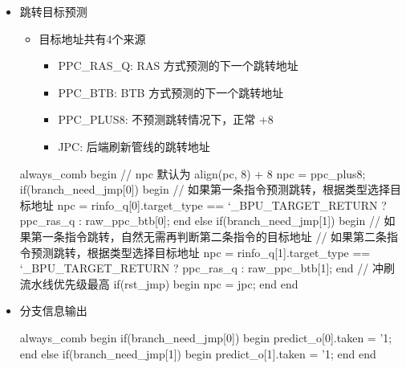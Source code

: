 \begin{itemize}
\begin{CodeBlock}[language=BookSystemVerilog]
// nvalid 逻辑
always_comb begin
  // 默认两条指令都有效
  nvalid = 2'b11;
  // 当npc的其实位置是相邻至指令的第二条指令
  // 将第一条指令无效化
  if(npc[2]) begin
    nvalid[0] = '0;
  end
end

// valid_o 逻辑
always_comb begin
  valid_o = valid_q & {!f_stall_i, !f_stall_i};
  // 若第一条指令预测跳转，将第二条指令无效化
  if(inst_0_jmp) begin
    valid_o[1] = '0;
  end
end

// 更新valid_q
always_ff @(posedge clk) begin
  if(!rst_n) begin
    valid_q <= 2'b11;
  end
  else begin
    // 当流水线不暂停或冲刷流水线时写入
    if(!f_stall_i || rst_jmp) begin
      valid_q <= nvalid;
    end
  end
end
\end{CodeBlock}
\item
  跳转目标预测

  \begin{itemize}
  \tightlist
  \item
    目标地址共有4个来源

    \begin{itemize}
    \tightlist
    \item
      PPC\_RAS\_Q: RAS 方式预测的下一个跳转地址
    \item
      PPC\_BTB: BTB 方式预测的下一个跳转地址
    \item
      PPC\_PLUS8: 不预测跳转情况下，正常 +8
    \item
      JPC: 后端刷新管线的跳转地址
    \end{itemize}
  \end{itemize}

\begin{CodeBlock}[language=BookSystemVerilog]
always_comb begin
  // npc 默认为 align(pc, 8) + 8
  npc = ppc_plus8;
  if(branch_need_jmp[0]) begin
    // 如果第一条指令预测跳转，根据类型选择目标地址
    npc = rinfo_q[0].target_type == `_BPU_TARGET_RETURN ? ppc_ras_q : raw_ppc_btb[0];
  end else if(branch_need_jmp[1]) begin
    // 如果第一条指令跳转，自然无需再判断第二条指令的目标地址
    // 如果第二条指令预测跳转，根据类型选择目标地址
    npc = rinfo_q[1].target_type == `_BPU_TARGET_RETURN ? ppc_ras_q : raw_ppc_btb[1];
  end
  // 冲刷流水线优先级最高
  if(rst_jmp) begin
    npc = jpc;
  end
end
\end{CodeBlock}
\item
  分支信息输出

\begin{CodeBlock}[language=BookSystemVerilog]
always_comb begin
  if(branch_need_jmp[0]) begin
    predict_o[0].taken = '1;
  end
  else if(branch_need_jmp[1]) begin
    predict_o[1].taken = '1;
  end
end


\end{CodeBlock}
\end{itemize}
